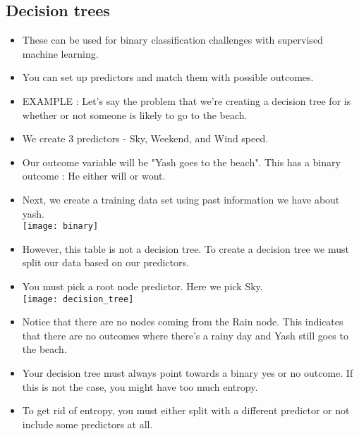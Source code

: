 \documentclass[11pt, oneside]{article}   	%
\begin{document}
\subsection{Decision trees}
\begin{itemize}
\item These can be used for binary classification challenges with supervised machine learning.
\item You can set up predictors and match them with possible outcomes.
\item EXAMPLE : Let's say the problem that we're creating a decision tree for is whether or not someone is likely to go to the beach.
\item We create 3 predictors - Sky, Weekend, and Wind speed.
\item Our outcome variable will be "Yash goes to the beach". This has a binary outcome : He either will or wont.
\item Next, we create a training data set using past information we have about yash.
\bigskip \\
\texttt{[image: binary]}
\bigskip \\
\item However, this table is not a decision tree. To create a decision tree we must split our data based on our predictors.
\item You must pick a root node predictor. Here we pick Sky.
\bigskip \\
\texttt{[image: decision\_tree]}
\bigskip \\
\item Notice that there are no nodes coming from the Rain node. This indicates that there are no outcomes where there's a rainy day and Yash still goes to the beach.
\item Your decision tree must always point towards a binary yes or no outcome. If this is not the case, you might have too much entropy.
\item To get rid of entropy, you must either split with a different predictor or not include some predictors at all.
\end{itemize}
\end{document}
